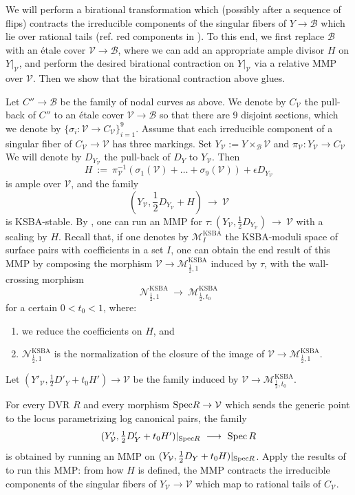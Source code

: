 \documentclass[a4paper,12pt]{amsart}
\DeclareMathOperator{\Spec}{Spec}
\DeclareMathOperator{\KSBA}{\mathrm{KSBA}}
\newcommand{\sB}{{\mathscr{B}}}
\newcommand{\cN}{{\mathcal{N}}}
\newcommand{\cV}{{\mathcal{V}}}
\newcommand\spec{\text{\rm Spec}}
\newcommand\cM{{\mathcal{M}}}
\theoremstyle{definition}
\theoremstyle{remark}
\begin{document}
We will perform a birational transformation which (possibly after a sequence of flips) contracts the irreducible components of the singular fibers of $Y\to \sB$ which lie over rational tails (ref. red components in ). To this end, we first replace $\sB$ with an \'etale cover $\cV\to \sB$, where we can add an appropriate ample divisor $H$ on $Y|_\cV$, and perform the desired birational contraction on $Y|_\cV$ via a relative MMP over $\cV$.
Then we show that the birational contraction above glues.

Let $C''\to \sB$ be the family of nodal curves as above. We denote by $C_\cV$ the pull-back of $C''$ to an \'etale cover $\cV\to \sB$ so that there are 9 disjoint sections, which we denote by $\{\sigma_i\colon \cV\to C_\cV\}_{i=1}^9$. Assume that each irreducible component of a singular fiber of $C_\cV\to \cV$ has three markings. Set $Y_\cV:= Y\times_{\sB}\cV$ and $\pi_\cV\colon Y_\cV\to C_\cV$ We will denote by $D_{Y_{\cV}}$ the pull-back of $D_Y$ to $Y_\cV$. Then \[H\ :=\ \pi_\cV^{-1}(\sigma_1(\cV) + \ldots +\sigma_9(\cV))+\epsilon D_{Y_{\cV}}\] is ample over $\cV$, and the family
$$\textstyle (Y_\cV,\frac{1}{2}D_{Y_{\cV}} + H)\ \longrightarrow \ \cV$$
is KSBA-stable. By \cite[Theorem 1.5]{meng2023mmp}, one can run an MMP for $\tau\colon (Y_\cV,\frac{1}{2}D_{Y_{\cV}})\ \longrightarrow \ \cV$ with a scaling by $H$. Recall that, if one denotes by $\cM^{\KSBA}_{I}$ the KSBA-moduli space of surface pairs with coefficients in a set $I$, one can obtain the end result of this MMP by composing the morphism $\cV\to \cM^{\KSBA}_{\frac{1}{2},1}$ induced by $\tau$, with the wall-crossing morphism  \[\cN^{\KSBA}_{\frac{1}{2},1} \ \longrightarrow \  \cM^{\KSBA}_{\frac{1}{2},t_0}\] for a certain $0<t_0<1$, where:
\begin{enumerate}
    \item we reduce the coefficients on $H$, and
    \item $\cN^{\KSBA}_{\frac{1}{2},1}$ is the normalization of the closure of the image of $\cV\to \cM^{\KSBA}_{\frac{1}{2},1}$.
\end{enumerate} Let
$(Y'_\cV, \frac{1}{2}D'_Y+t_0H')\to \cV$ be the family induced by $\cV\to \cM^{\KSBA}_{\frac{1}{2},t_0}$.

For every DVR $R$ and every morphism $\spec R\to \cV$ which sends the generic point to the locus parametrizing log canonical pairs, the family $$\textstyle (Y'_\cV, \frac{1}{2}D'_Y+t_0H')|_{\spec R} \ \longrightarrow \ \Spec R$$ is obtained by running an MMP on $(Y_\cV, \frac{1}{2}D_Y+t_0H)|_{\spec R}$.
Apply the results of  to run this MMP: from how $H$ is defined, the MMP contracts the irreducible components of the singular fibers of $Y_\cV\to \cV$ which map to rational tails of $C_\cV$.
\end{document}

